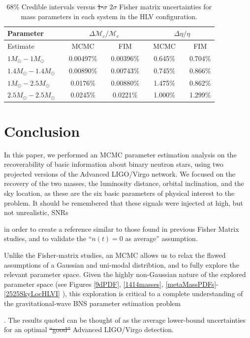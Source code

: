 \documentclass[11pt,a4paper]{emulateapj} 
\newcommand{\carl}[1]{{\color{red} #1}}
\begin{document}
\begin{table}[h!]
\centering
\caption{68\% Credible intervals versus \sout{1-$\sigma$} \carl{$2\sigma$} Fisher matrix uncertainties for mass parameters in each system in the HLV configuration.}
  \tabcolsep=0.11cm
    {\renewcommand{\arraystretch}{1.3} 
\begin{tabular}{lcccccccc}

\hline\hline Parameter & \vline & \multicolumn{3}{c}{$\Delta\mathcal{M}_c / \mathcal{M}_c$} & \vline & \multicolumn{3}{c}{$\Delta \eta / \eta$} \\ \hline \hline

Estimate & \vline & MCMC & \vline & FIM & \vline & MCMC & \vline & FIM \\ \hline

$1M_{\odot}-1M_{\odot}$ & \vline &  0.00497\% & \vline & 0.00396\% & \vline & 0.645\% & \vline & 0.704\% \\
$1.4M_{\odot}-1.4M_{\odot}$ & \vline &  0.00890\% & \vline & 0.00743\% & \vline & 0.745\% & \vline & 0.866\% \\
$1M_{\odot}-2.5M_{\odot}$& \vline &  0.0176\% & \vline & 0.00880\% & \vline & 1.475\% & \vline & 0.862\% \\
$2.5M_{\odot}-2.5M_{\odot}$& \vline &  0.0245\% & \vline & 0.0221\% & \vline & 1.000\% & \vline & 1.299\% \\

\hline\hline

\end{tabular}}
\label{FIMvsMCMC}
\end{table}

\section{Conclusion}
\label{conclusionSection}

In this paper, we performed an MCMC parameter estimation analysis on
the recoverability of basic information about binary neutron stars,
using two projected versions of the Advanced LIGO/Virgo network.  We
focused on the recovery of the two masses, the luminosity distance,
orbital inclination, and the sky location, as these are the six basic
parameters of physical interest to the problem.  It should be remembered that these signals were injected at high, 
but not unrealistic, SNRs \carl{in order to create a reference similar to those found in previous
Fisher Matrix studies, and to validate the ``$n(t) = 0$ as average'' assumption.  

 Unlike the Fisher-matrix studies, an MCMC allows us to relax the flawed assumptions of a Gaussian and uni-modal 
 distribtion, and to
fully explore the relevant parameter space.  Given the highly non-Gaussian nature of the explored 
parameter space (see Figures \ref{9dPDF}, \ref{1414masses}, \ref{metaMassPDFs}-\ref{2525SkyLocHLVI} ), this exploration is critical to a complete 
understanding of the gravitational-wave BNS parameter estimation problem}.  
The results quoted can be thought of as the
average \carl{lower-bound} uncertainties for an \carl{optimal} \sout{``good''} Advanced LIGO/Virgo detection.
\end{document}
